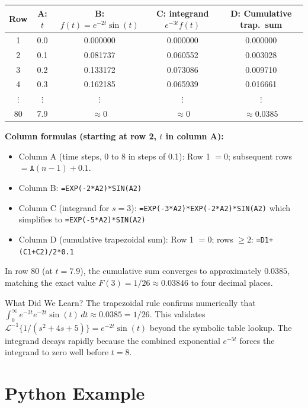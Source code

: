 \documentclass[12pt,a4paper]{article}
\begin{document}
\begin{center}
\begin{tabular}{@{}ccccc@{}}
\toprule
Row & \textbf{A: $t$} & \textbf{B: $f(t)=e^{-2t}\sin(t)$}
    & \textbf{C: integrand $e^{-3t}f(t)$} & \textbf{D: Cumulative trap.~sum} \\
\midrule
1   & 0.0  & 0.000000 & 0.000000 & 0.000000 \\
2   & 0.1  & 0.081737 & 0.060552 & 0.003028 \\
3   & 0.2  & 0.133172 & 0.073086 & 0.009710 \\
4   & 0.3  & 0.162185 & 0.065939 & 0.016661 \\
$\vdots$ & $\vdots$ & $\vdots$ & $\vdots$ & $\vdots$ \\
80  & 7.9  & $\approx 0$ & $\approx 0$ & $\approx 0.0385$ \\
\bottomrule
\end{tabular}
\end{center}

\noindent\textbf{Column formulas (starting at row 2, $t$ in column A):}
\begin{itemize}
  \item Column A (time steps, 0 to 8 in steps of 0.1): Row 1 $= 0$;
        subsequent rows $= \texttt{A}(n-1)+0.1$.
  \item Column B: \texttt{=EXP(-2*A2)*SIN(A2)}
  \item Column C (integrand for $s=3$): \texttt{=EXP(-3*A2)*EXP(-2*A2)*SIN(A2)}
        which simplifies to \texttt{=EXP(-5*A2)*SIN(A2)}
  \item Column D (cumulative trapezoidal sum): Row 1 $= 0$;
        rows $\geq 2$: \texttt{=D1+(C1+C2)/2*0.1}
\end{itemize}
In row 80 (at $t = 7.9$), the cumulative sum converges to approximately
$0.0385$, matching the exact value $F(3)=1/26 \approx 0.03846$ to four
decimal places.

\begin{learnbox}{What Did We Learn?}
The trapezoidal rule confirms numerically that $\int_0^\infty e^{-3t}e^{-2t}\sin(t)\,dt \approx 0.0385 = 1/26$.
This validates $\mathcal{L}^{-1}\{1/(s^2+4s+5)\}= e^{-2t}\sin(t)$ beyond
the symbolic table lookup. The integrand decays rapidly because the combined
exponential $e^{-5t}$ forces the integrand to zero well before $t=8$.
\end{learnbox}

\section{Python Example}
\end{document}

